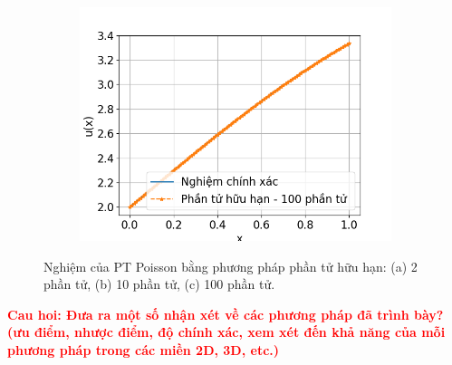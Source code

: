 \begin{figure}[htbp]
\begin{subfigure}[b]{0.3\linewidth}
        \caption{}
        \label{fig:PTHH_10el}
    \end{subfigure}\hfill
    \begin{subfigure}[b]{0.3\linewidth}
        \centering
        \includegraphics[width=\linewidth]{Tuan6/figure/PTHH_100el.png}
        \caption{}
        \label{fig:PTHH_100el}
    \end{subfigure}
    \caption{Nghiệm của PT Poisson bằng phương pháp phần tử hữu hạn: (a) 2 phần tử, (b) 10 phần tử, (c) 100 phần tử.}
    \label{fig_PTHHresults}
\end{figure}

\textbf{\textcolor{red}{Cau hoi: Đưa ra một số nhận xét về các phương pháp đã trình bày? (ưu điểm, nhược điểm, độ chính xác, xem xét đến khả năng của mỗi phương pháp trong các miền 2D, 3D, etc.)}}